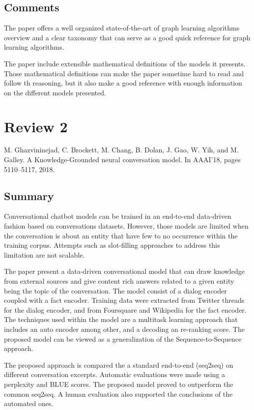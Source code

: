\documentclass{article}
\begin{document}
\subsection*{Comments}

The paper offers a well organized state-of-the-art of graph learning
algorithms overview and a clear taxonomy that can serve as a good quick
reference for graph learning algorithms.

The paper include extensible mathematical definitions of the models it
presents. Those mathematical definitions can make the paper sometime hard
to read and follow th reasoning, but it also make a good reference with
enough information on the different models presented.


\section*{Review 2}
M. Ghazvininejad, C. Brockett, M. Chang, B. Dolan, J. Gao, W. Yih, and
M. Galley. A Knowledge-Grounded neural conversation model.
In AAAI’18, pages 5110–5117, 2018.

\subsection*{Summary}

Conversational chatbot models can be trained in an end-to-end data-driven
fashion based on conversations datasets. However, those models are limited
when the conversation is about an entity that have few to no occurrence
within the training corpus. Attempts such as slot-filling approaches to
address this limitation are not scalable.

The paper present a data-driven conversational model that can draw knowledge
from external sources and give content rich answers related to a given entity
being the topic of the conversation. The model consist of a dialog encoder
coupled with a fact encoder. Training data were extracted from Twitter threads
for the dialog encoder, and from Foursquare and Wikipedia for the fact encoder.
The techniques used within the model are a multitask learning approach that
includes an auto encoder among other, and a decoding an re-ranking score.
The proposed model can be viewed as a generalization of the
Sequence-to-Sequence approach.

The proposed approach is compared the a standard end-to-end (seq2seq)
on different conversation excerpts. Automatic evaluations were made using
a perplexity and BLUE scores. The proposed model proved to outperform the
common seq2seq. A human evaluation also supported the conclusions of the
automated ones. 
\end{document}
